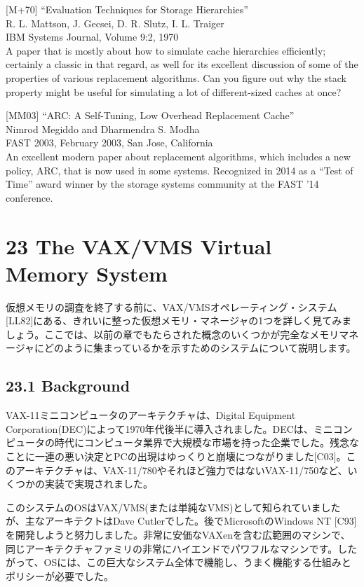 {[}M+70{]} ``Evaluation Techniques for Storage Hierarchies''\\
R. L. Mattson, J. Gecsei, D. R. Slutz, I. L. Traiger\\
IBM Systems Journal, Volume 9:2, 1970\\
A paper that is mostly about how to simulate cache hierarchies
efficiently; certainly a classic in that regard, as well for its
excellent discussion of some of the properties of various replacement
algorithms. Can you figure out why the stack property might be useful
for simulating a lot of different-sized caches at once?

{[}MM03{]} ``ARC: A Self-Tuning, Low Overhead Replacement Cache''\\
Nimrod Megiddo and Dharmendra S. Modha\\
FAST 2003, February 2003, San Jose, California\\
An excellent modern paper about replacement algorithms, which includes a
new policy, ARC, that is now used in some systems. Recognized in 2014 as
a ``Test of Time'' award winner by the storage systems community at the
FAST '14 conference.

\hypertarget{the-vaxvms-virtual-memory-system}{%
\section*{23 The VAX/VMS Virtual Memory
System}\label{the-vaxvms-virtual-memory-system}}

仮想メモリの調査を終了する前に、VAX/VMSオペレーティング・システム{[}LL82{]}にある、きれいに整った仮想メモリ・マネージャの1つを詳しく見てみましょう。ここでは、以前の章でもたらされた概念のいくつかが完全なメモリマネージャにどのように集まっているかを示すためのシステムについて説明します。

\hypertarget{background}{%
\subsection*{23.1 Background}\label{background}}

VAX-11ミニコンピュータのアーキテクチャは、Digital Equipment
Corporation(DEC)によって1970年代後半に導入されました。DECは、ミニコンピュータの時代にコンピュータ業界で大規模な市場を持った企業でした。残念なことに一連の悪い決定とPCの出現はゆっくりと崩壊につながりました{[}C03{]}。このアーキテクチャは、VAX-11/780やそれほど強力ではないVAX-11/750など、いくつかの実装で実現されました。

このシステムのOSはVAX/VMS(または単純なVMS)として知られていましたが、主なアーキテクトはDave
Cutlerでした。後でMicrosoftのWindows NT
{[}C93{]}を開発しようと努力しました。非常に安価なVAXenを含む広範囲のマシンで、同じアーキテクチャファミリの非常にハイエンドでパワフルなマシンです。したがって、OSには、この巨大なシステム全体で機能し、うまく機能する仕組みとポリシーが必要でした。

